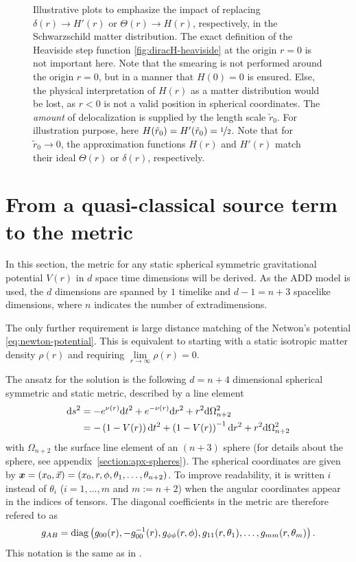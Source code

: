\documentclass[12pt,a4paper]{report}
\numberwithin{equation}{chapter}
\begin{document}
\begin{figure}
\begin{subfigure}{0.45\textwidth}
\end{subfigure}
%
\caption[Illustrative plots, comparing point-source describing functions with their smeared, delocalized ones.]{Illustrative plots to emphasize the impact of replacing $\delta(r) \to H'(r)$ or $\Theta(r) \to H(r)$, respectively, in the Schwarzschild matter distribution. The exact definition of the Heaviside step function \ref{fig:diracH-heaviside} at the origin $r=0$ is not important here. Note that the smearing is not performed around the origin $r=0$, but in a manner that $H(0)=0$ is ensured. Else, the physical interpretation of $H(r)$ as a matter distribution would be lost, as $r<0$ is not a valid position in spherical coordinates. The \emph{amount} of delocalization is supplied by the length scale $\tilde r_0$. For illustration purpose, here $H(\tilde r_0)=H'(\tilde r_0)= \nicefrac 12$. Note that for $\tilde r_0 \to 0$, the approximation functions $H(r)$ and $H'(r)$ match their ideal $\Theta(r)$ or $\delta(r)$, respectively.}%
\label{fig:delta-smearing}
%
\end{figure}

\clearpage
\section{From a quasi-classical source term to the metric}\label{sec:derivation-metric-H}
In this section, the metric for any static spherical symmetric gravitational potential $V(r)$ in $d$ space time dimensions will be derived. As the ADD model is used, the $d$ dimensions are spanned by $1$ timelike and $d-1=n+3$ spacelike dimensions, where $n$ indicates the number of extradimensions.

The only further requirement is large distance matching of the Netwon's potential \eqref{eq:newton-potential}. This is equivalent to starting with a static isotropic matter density $\rho(r)$ and requiring $\lim \limits_{r\to\infty} \rho(r)=0$.

The ansatz for the solution is the following $d=n+4$ dimensional spherical symmetric and static metric, described by a line element
\begin{align}\label{eq:Schwarzschild-ndim-V}
\mathrm{d} s^2 &=
- e^{\nu(r)} \mathrm{d} t^2
+ e^{-\nu(r)} \mathrm{d} r^2
+ r^2 \mathrm{d} \Omega_{n+2}^2
\\ &=
- \left( 1 - V(r) \right) \mathrm{d} t^2
+ \left( 1 - V(r) \right)^{-1} \mathrm{d} r^2
+ r^2 \mathrm{d} \Omega_{n+2}^2
\end{align}
with $\Omega_{n+2}$ the surface line element of an $(n+3)$ sphere (for details about the sphere, see appendix~\ref{section:apx-spheres}). The spherical coordinates are given by $\boldsymbol{ x } = (x_0, \vec x) = (x_0, r, \phi, \theta_1, \dots, \theta_{n+2})$. To improve readability, it is written $i$ instead of $\theta_i$ ($i=1,\dots,m$ and $m:=n+2$) when the angular coordinates appear in the indices of tensors. The diagonal coefficients in the metric are therefore refered to as
\begin{equation}
g_{AB} = \operatorname{diag} \left(
g_{00}(r), -g_{00}^{-1}(r),
g_{\phi\phi}(r,\phi),
g_{11}(r,\theta_1),
\dots,
g_{mm}(r,\theta_m)
\right).
\end{equation}
This notation is the same as in \cite{Rizzo}.
\end{document}
